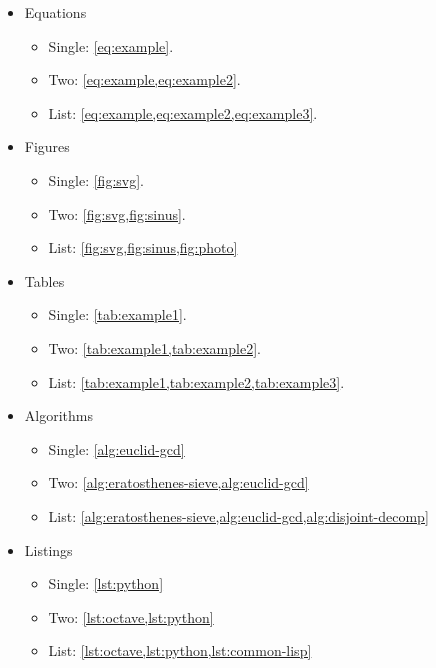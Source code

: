 \begin{itemize}
\item Equations
\begin{itemize}
  \item Single: \cref{eq:example}.
  \item Two: \cref{eq:example,eq:example2}.
  \item List: \cref{eq:example,eq:example2,eq:example3}.
\end{itemize}
\item Figures
\begin{itemize}
  \item Single: \cref{fig:svg}.
  \item Two: \cref{fig:svg,fig:sinus}.
  \item List: \cref{fig:svg,fig:sinus,fig:photo}
\end{itemize}
\item Tables
\begin{itemize}
  \item Single: \cref{tab:example1}.
  \item Two: \cref{tab:example1,tab:example2}.
  \item List: \cref{tab:example1,tab:example2,tab:example3}.
\end{itemize}
\item Algorithms
\begin{itemize}
  \item Single: \cref{alg:euclid-gcd}
  \item Two: \cref{alg:eratosthenes-sieve,alg:euclid-gcd}
  \item List: \cref{alg:eratosthenes-sieve,alg:euclid-gcd,alg:disjoint-decomp}
\end{itemize}
\item Listings
\begin{itemize}
  \item Single: \cref{lst:python}
  \item Two: \cref{lst:octave,lst:python}
  \item List: \cref{lst:octave,lst:python,lst:common-lisp}
\end{itemize} \end{itemize}

